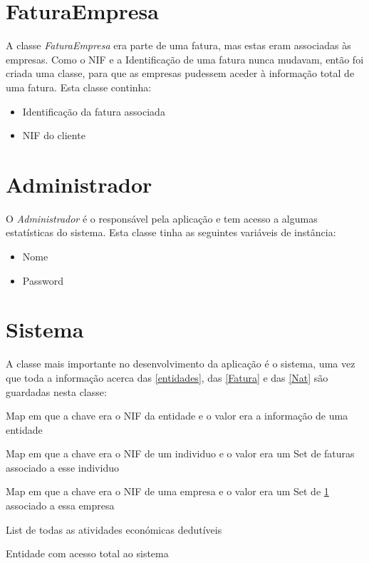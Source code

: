 \documentclass[10pt, a4paper]{report}
\begin{document}
\section{FaturaEmpresa}\label{FatEmpresa}

A classe \emph{FaturaEmpresa} era parte de uma fatura, mas estas eram associadas às empresas. Como o NIF e a Identificação de uma fatura nunca mudavam, então foi criada uma classe, para que as empresas pudessem aceder à informação total de uma fatura. Esta classe continha:

\begin{itemize}
	\item Identificação da fatura associada
	\item NIF do cliente
\end{itemize}

\section{Administrador}\label{Admin}

O \emph{Administrador} é o responsável pela aplicação e tem acesso a algumas estatísticas do sistema. Esta classe tinha as seguintes variáveis de instância:

\begin{itemize}
	\item Nome
	\item Password
\end{itemize}

\section{Sistema}\label{Sistema}

A classe mais importante no desenvolvimento da aplicação é o sistema, uma vez que toda a informação acerca das \ref{entidades}, das \ref{Fatura} e das \ref{Nat} são guardadas nesta classe:

\begin{description}[align=left]
	\item [info] Map em que a chave era o NIF da entidade e o valor era a informação de uma entidade
	\item [sistema] Map em que a chave era o NIF de um individuo e o valor era um Set de faturas associado a esse individuo
	\item [empFaturas] Map em que a chave era o NIF de uma empresa e o valor era um Set de \ref{FatEmpresa} associado a essa empresa
	\item [natureza] List de todas as atividades económicas dedutíveis
	\item [admin] Entidade com acesso total ao sistema
\end{description}
\end{document}
